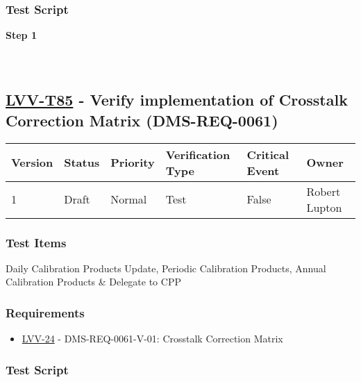 \hypertarget{test-script-174}{%
\subsubsection{Test Script}\label{test-script-174}}

\textbf{Step 1}\\
~\\
~\\

\hypertarget{lvv-t85---verify-implementation-of-crosstalk-correction-matrix-dms-req-0061}{%
\subsection{\texorpdfstring{\href{https://jira.lsstcorp.org/secure/Tests.jspa\#/testCase/LVV-T85}{LVV-T85}
- Verify implementation of Crosstalk Correction Matrix
(DMS-REQ-0061)}{LVV-T85 - Verify implementation of Crosstalk Correction Matrix (DMS-REQ-0061)}}\label{lvv-t85---verify-implementation-of-crosstalk-correction-matrix-dms-req-0061}}

\begin{longtable}[]{@{}llllll@{}}
\toprule
Version & Status & Priority & Verification Type & Critical Event &
Owner\tabularnewline
\midrule
\endhead
1 & Draft & Normal & Test & False & Robert Lupton\tabularnewline
\bottomrule
\end{longtable}

\hypertarget{test-items-174}{%
\subsubsection{Test Items}\label{test-items-174}}

Daily Calibration Products Update, Periodic Calibration Products, Annual
Calibration Products \& Delegate to CPP

\hypertarget{requirements-175}{%
\subsubsection{Requirements}\label{requirements-175}}

\begin{itemize}
\tightlist
\item
  \href{https://jira.lsstcorp.org/browse/LVV-24}{LVV-24} -
  DMS-REQ-0061-V-01: Crosstalk Correction Matrix
\end{itemize}

\hypertarget{test-script-175}{%
\subsubsection{Test Script}\label{test-script-175}}

